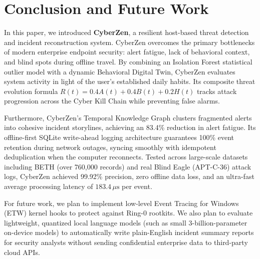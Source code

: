 \documentclass[conference]{IEEEtran}
\begin{document}
\section{Conclusion and Future Work}
In this paper, we introduced \textbf{CyberZen}, a resilient host-based threat detection and incident reconstruction system. CyberZen overcomes the primary bottlenecks of modern enterprise endpoint security: alert fatigue, lack of behavioral context, and blind spots during offline travel. By combining an Isolation Forest statistical outlier model with a dynamic Behavioral Digital Twin, CyberZen evaluates system activity in light of the user's established daily habits. Its composite threat evolution formula $R(t) = 0.4 A(t) + 0.4 B(t) + 0.2 H(t)$ tracks attack progression across the Cyber Kill Chain while preventing false alarms. 

Furthermore, CyberZen's Temporal Knowledge Graph clusters fragmented alerts into cohesive incident storylines, achieving an 83.4\% reduction in alert fatigue. Its offline-first SQLite write-ahead logging architecture guarantees 100\% event retention during network outages, syncing smoothly with idempotent deduplication when the computer reconnects. Tested across large-scale datasets including BETH (over 760,000 records) and real Blind Eagle (APT-C-36) attack logs, CyberZen achieved 99.92\% precision, zero offline data loss, and an ultra-fast average processing latency of $183.4\,\mu\text{s}$ per event.

For future work, we plan to implement low-level Event Tracing for Windows (ETW) kernel hooks to protect against Ring-0 rootkits. We also plan to evaluate lightweight, quantized local language models (such as small 3-billion-parameter on-device models) to automatically write plain-English incident summary reports for security analysts without sending confidential enterprise data to third-party cloud APIs.
\end{document}
